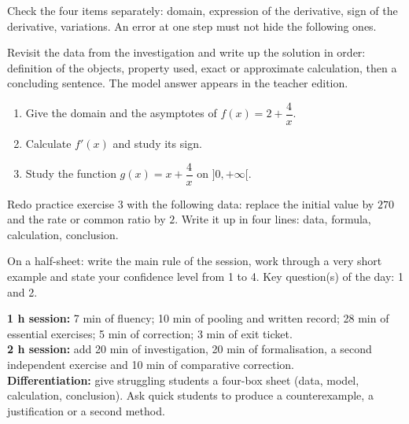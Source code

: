 \begin{traceecrite}Check the four items separately: domain, expression of the derivative, sign of the derivative, variations. An error at one step must not hide the following ones.\end{traceecrite}

\begin{exemple}
Revisit the data from the investigation and write up the solution in order: definition of the objects, property used, exact or approximate calculation, then a concluding sentence. The model answer appears in the teacher edition.
\end{exemple}

\begin{exercice}[-- essential]
\begin{enumerate}\item Give the domain and the asymptotes of $f(x)=2+\dfrac{4}x$.\item Calculate $f'(x)$ and study its sign.\item Study the function $g(x)=x+\dfrac{4}x$ on $]0,+\infty[$.\end{enumerate}
\end{exercice}


\begin{dm}Redo practice exercise 3 with the following data: replace the initial value by $270$ and the rate or common ratio by $2$. Write it up in four lines: data, formula, calculation, conclusion.\end{dm}

\begin{sortie}On a half-sheet: write the main rule of the session, work through a very short example and state your confidence level from 1 to 4. Key question(s) of the day: 1 and 2.\end{sortie}

\ifprof
\begin{methode}
\textbf{1 h session:} 7 min of fluency; 10 min of pooling and written record; 28 min of essential exercises; 5 min of correction; 3 min of exit ticket.\\
\textbf{2 h session:} add 20 min of investigation, 20 min of formalisation, a second independent exercise and 10 min of comparative correction.\\
\textbf{Differentiation:} give struggling students a four-box sheet (data, model, calculation, conclusion). Ask quick students to produce a counterexample, a justification or a second method.
\end{methode}
\fi
